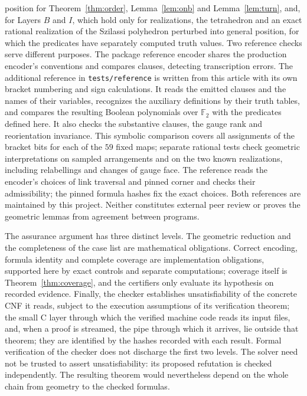 \documentclass[11pt,reqno]{amsart}
\theoremstyle{plain}
\theoremstyle{definition}
\newcommand{\FF}{\mathbb{F}_2}
\begin{document}
\begin{description}[leftmargin=1.6em,style=nextline]
  position for Theorem~\ref{thm:order}, Lemma~\ref{lem:onb} and Lemma~\ref{lem:turn}, and, for Layers
  $B$ and $I$, which hold only for realizations, the tetrahedron and an exact rational realization of
  the Szilassi polyhedron \cite{GrunbaumSzilassi2009} perturbed into general position, for which the
  predicates have separately computed truth values. Two reference checks serve different purposes.
  The package reference encoder shares the production encoder's conventions and compares clauses,
  detecting transcription errors. The additional reference in \texttt{tests/reference} is written
  from this article with its own bracket numbering and sign calculations. It reads the emitted
  clauses and the names of their variables, recognizes the auxiliary definitions by their truth
  tables, and compares the resulting Boolean polynomials over $\FF$ with the predicates defined
  here. It also checks the substantive clauses, the gauge rank and reorientation invariance.
  This symbolic comparison covers all assignments of the bracket bits for each of the $59$
  fixed maps; separate rational tests check geometric interpretations on sampled arrangements
  and on the two known realizations, including relabellings and changes of gauge face.
  The reference reads the encoder's choices of link traversal and pinned corner and checks
  their admissibility; the pinned formula hashes fix the exact choices. Both references are
  maintained by this project. Neither constitutes external peer review or proves the geometric
  lemmas from agreement between programs.
\end{description}

The assurance argument has three distinct levels. The geometric reduction and the
completeness of the case list are mathematical obligations. Correct encoding, formula
identity and complete coverage are implementation obligations, supported here by exact
controls and separate computations; coverage itself is Theorem~\ref{thm:coverage}, and the
certifiers only evaluate its hypothesis on recorded evidence. Finally, the checker establishes
unsatisfiability of the concrete CNF it reads, subject to the execution assumptions of its
verification theorem; the small C layer through which the verified machine code reads its input
files, and, when a proof is streamed, the pipe through which it arrives, lie outside that theorem;
they are identified by the hashes recorded with each result. Formal verification of the checker does not discharge the
first two levels. The solver need not be trusted to assert unsatisfiability: its proposed
refutation is checked independently. The resulting theorem would nevertheless depend on the whole
chain from geometry to the checked formulas.
\end{document}
